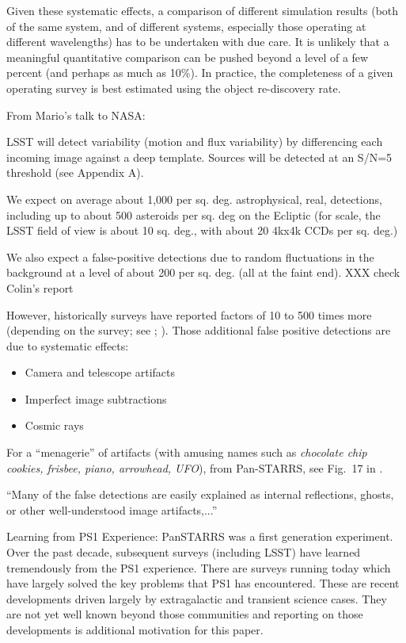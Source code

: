 \documentclass[12pt,preprint]{aastex}
\begin{document}
Given these systematic effects, a comparison of different simulation results (both of the same system,
and of different systems, especially those operating at different wavelengths) has to be undertaken
with due care. It is unlikely that a meaningful quantitative comparison can be pushed beyond a level
of a few percent (and perhaps as much as 10\%). In practice, the completeness of a given operating survey
is best estimated using the object re-discovery rate. 


From Mario's talk to NASA:

LSST will detect variability (motion and flux variability) by
differencing each incoming image against a deep template.
Sources will be detected at an S/N=5 threshold (see Appendix A). 

We expect on average about 1,000 per sq. deg. astrophysical, real,
detections, including up to about 500 asteroids per sq. deg on the 
Ecliptic (for scale, the LSST field of view is about 10 sq. deg., with 
about 20 4kx4k CCDs per sq. deg.)

We also expect a false-positive detections due to random
fluctuations in the background at a level of about 200 per
sq. deg. (all at the faint end).  XXX check Colin's report 

However, historically surveys have reported factors of 10 to 500 times
more (depending on the survey; see \citep{denneau13};
\citep{goldstein15} ). 
Those additional false positive
detections are due to systematic effects: 
\begin{itemize} 
\item Camera and telescope artifacts
\item Imperfect image subtractions
\item Cosmic rays
\end{itemize} 

For a ``menagerie'' of artifacts (with amusing names such as 
{\it chocolate chip cookies, frisbee, piano, arrowhead, UFO}), from
Pan-STARRS, see Fig.~17 in \cite{denneau13}. 


``Many of the false detections are easily explained as internal
reflections, ghosts, or other well-understood image artifacts,...''


Learning from PS1 Experience: PanSTARRS was a first generation
experiment. Over the past decade, subsequent surveys (including LSST) 
have learned tremendously from the PS1 experience. There are surveys 
running today which have largely solved the key problems that PS1 has encountered.
These are recent developments driven largely by extragalactic and
transient science cases. They are not yet well known beyond those
communities and reporting on those developments is additional
motivation for this paper. 
 
\end{document}
